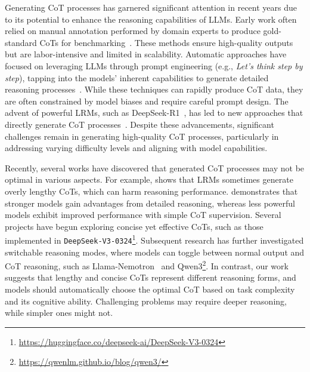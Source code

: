 \documentclass{article}
\begin{document}
Generating CoT processes has garnered significant attention in recent years due to its potential to enhance the reasoning capabilities of LLMs. Early work often relied on manual annotation performed by domain experts to produce gold-standard CoTs for benchmarking~\cite{DBLP:conf/nips/HuangWXLZXFYCY024,DBLP:journals/corr/abs-2410-07985}. These methods ensure high-quality outputs but are labor-intensive and limited in scalability. Automatic approaches have focused on leveraging LLMs through prompt engineering (e.g., \emph{Let's think step by step}), tapping into the models' inherent capabilities to generate detailed reasoning processes~\citep{DBLP:conf/nips/Wei0SBIXCLZ22,DBLP:conf/nips/YaoYZS00N23,DBLP:conf/emnlp/LiuG0HZQZ23,DBLP:conf/iclr/0002WSLCNCZ23}. While these techniques can rapidly produce CoT data, they are often constrained by model biases and require careful prompt design. The advent of powerful LRMs, such as DeepSeek-R1~\cite{DBLP:journals/corr/abs-2501-12948}, has led to new approaches that directly generate CoT processes~\cite{cai2025trainingsmallreasoningllms,openthoughts}. Despite these advancements, significant challenges remain in generating high-quality CoT processes, particularly in addressing varying difficulty levels and aligning with model capabilities.

Recently, several works have discovered that generated CoT processes may not be optimal in various aspects. For example, \cite{DBLP:journals/corr/abs-2502-18080} shows that LRMs sometimes generate overly lengthy CoTs, which can harm reasoning performance. \cite{DBLP:journals/corr/abs-2502-18001} demonstrates that stronger models gain advantages from detailed reasoning, whereas less powerful models exhibit improved performance with simple CoT supervision. Several projects have begun exploring concise yet effective CoTs, such as those implemented in \texttt{DeepSeek-V3-0324}\footnote{\url{https://huggingface.co/deepseek-ai/DeepSeek-V3-0324}}. Subsequent research has further investigated switchable reasoning modes, where models can toggle between normal output and CoT reasoning, such as Llama-Nemotron~\cite{bercovich2025llamanemotron} and Qwen3\footnote{\url{https://qwenlm.github.io/blog/qwen3/}}. In contrast, our work suggests that lengthy and concise CoTs represent different reasoning forms, and models should automatically choose the optimal CoT based on task complexity and its cognitive ability. Challenging problems may require deeper reasoning, while simpler ones might not.
\end{document}
